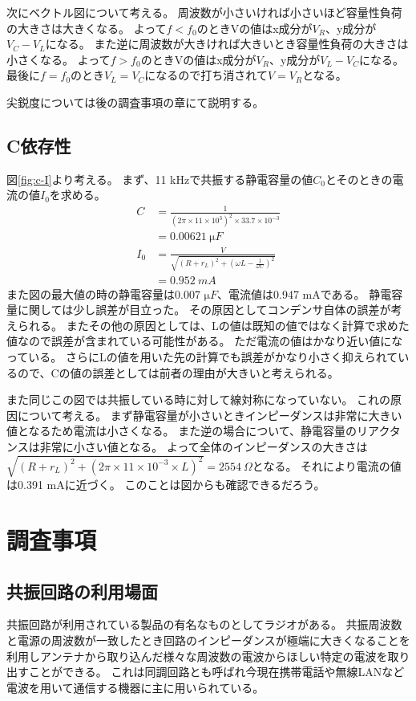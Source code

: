 \documentclass[11pt,a4paper,fleqn]{jsarticle}
\begin{document}
次にベクトル図について考える。
周波数が小さいければ小さいほど容量性負荷の大きさは大きくなる。
よって$f<f_{0}$のときVの値はx成分が$V_{R}$、y成分が$V_{C}-V_{L}$になる。
また逆に周波数が大きければ大きいとき容量性負荷の大きさは小さくなる。
よって$f>f_{0}$のときVの値はx成分が$V_{R}$、y成分が$V_{L}-V_{C}$になる。
最後に$f=f_{0}$のとき$V_{L}=V_{C}$になるので打ち消されて$V=V_{R}$となる。

尖鋭度については後の調査事項の章にて説明する。

\subsection{C依存性}
図\ref{fig:c-I}より考える。
まず、11 kHzで共振する静電容量の値$C_{0}$とそのときの電流の値$I_{0}$を求める。
\begin{align}
C&=\frac{1}{(2\pi \times 11\times 10^{3})^2\times 33.7\times 10^{-3}}\\
&=0.00621\ \si{\micro F}\\
I_{0}&=\frac{V}{\sqrt{(R+r_{L})^2+(\omega L-\frac{1}{\omega C})^2}}\\
&=0.952\ \si{mA}
\end{align}
また図の最大値の時の静電容量は0.007 $\si{\micro F}$、電流値は0.947 mAである。
静電容量に関しては少し誤差が目立った。
その原因としてコンデンサ自体の誤差が考えられる。
またその他の原因としては、Lの値は既知の値ではなく計算で求めた値なので誤差が含まれている可能性がある。
ただ電流の値はかなり近い値になっている。
さらにLの値を用いた先の計算でも誤差がかなり小さく抑えられているので、Cの値の誤差としては前者の理由が大きいと考えられる。

また同じこの図では共振している時に対して線対称になっていない。
これの原因について考える。
まず静電容量が小さいときインピーダンスは非常に大きい値となるため電流は小さくなる。
また逆の場合について、静電容量のリアクタンスは非常に小さい値となる。
よって全体のインピーダンスの大きさは$\sqrt{(R+r_{L})^2+(2\pi \times 11\times 10^{-3}\times L)^2}=2554\ \Omega$となる。
それにより電流の値は0.391 mAに近づく。
このことは図からも確認できるだろう。

\section{調査事項}
\subsection{共振回路の利用場面}
共振回路が利用されている製品の有名なものとしてラジオがある。
共振周波数と電源の周波数が一致したとき回路のインピーダンスが極端に大きくなることを利用しアンテナから取り込んだ様々な周波数の電波からほしい特定の電波を取り出すことができる。
これは同調回路とも呼ばれ今現在携帯電話や無線LANなど電波を用いて通信する機器に主に用いられている。
\end{document}

